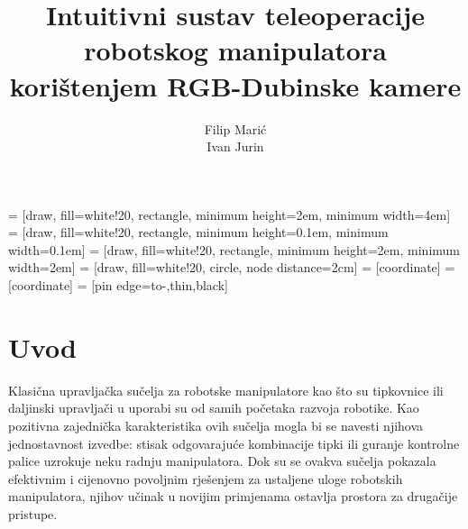 \documentclass[times, utf8, diplomski, numeric]{fer}
\begin{document}
\renewcommand{\labelitemi}{$\bullet$}
 = [draw, fill=white!20, rectangle,
    minimum height=2em, minimum width=4em]
 = [draw, fill=white!20, rectangle, 
    minimum height=0.1em, minimum width=0.1em]    
 = [draw, fill=white!20, rectangle, 
    minimum height=2em, minimum width=2em]
 = [draw, fill=white!20, circle, node distance=2cm]
 = [coordinate]
 = [coordinate]
 = [pin edge={to-,thin,black}]


\title{Intuitivni sustav teleoperacije robotskog manipulatora korištenjem RGB-Dubinske kamere}

\author{Filip Marić \\ Ivan Jurin}

\maketitle


\tableofcontents

\chapter{Uvod}
Klasična upravljačka sučelja za robotske manipulatore kao što su tipkovnice ili daljinski upravljači u uporabi su od samih početaka razvoja robotike.
Kao pozitivna zajednička karakteristika ovih sučelja mogla bi se navesti njihova jednostavnost izvedbe: stisak odgovarajuće kombinacije tipki ili guranje kontrolne palice uzrokuje neku radnju manipulatora.
Dok su se ovakva sučelja pokazala efektivnim i cijenovno povoljnim rješenjem za ustaljene uloge robotskih manipulatora, njihov učinak u novijim primjenama ostavlja prostora za drugačije pristupe.
\end{document}
